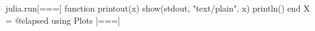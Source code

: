 \documentclass{article}
\begin{document}
\begin{luacode*}
	julia.run[===[
	function printout(x)
		show(stdout, "text/plain", x)
		println()
	end
	X = @elapsed using Plots
	]===]
\end{luacode*}

\edef\value{}

\texttt{\meaning\value}
\end{document}

